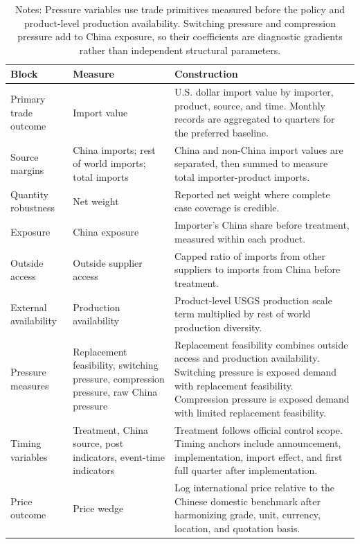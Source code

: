 \begin{table}[htbp]
\caption{Main Outcomes and Pressure Variables}
\label{tab:variables_outcomes}
\centering
\begingroup
\small
\setlength{\tabcolsep}{4pt}
\renewcommand{\arraystretch}{1.08}
\begin{tabularx}{\textwidth}{>{\raggedright\arraybackslash}p{}>{\raggedright\arraybackslash}p{}>{\raggedright\arraybackslash}X}
\toprule
Block & Measure & Construction \\
\midrule
Primary trade outcome & Import value & U.S. dollar import value by importer, product, source, and time. Monthly records are aggregated to quarters for the preferred baseline. \\
Source margins & China imports; rest of world imports; total imports & China and non-China import values are separated, then summed to measure total importer-product imports. \\
Quantity robustness & Net weight & Reported net weight where complete case coverage is credible. \\
Exposure & China exposure & Importer's China share before treatment, measured within each product. \\
Outside access & Outside supplier access & Capped ratio of imports from other suppliers to imports from China before treatment. \\
External availability & Production availability & Product-level USGS production scale term multiplied by rest of world production diversity. \\
Pressure measures & Replacement feasibility, switching pressure, compression pressure, raw China pressure & Replacement feasibility combines outside access and production availability. Switching pressure is exposed demand with replacement feasibility. Compression pressure is exposed demand with limited replacement feasibility. \\
Timing variables & Treatment, China source, post indicators, event-time indicators & Treatment follows official control scope. Timing anchors include announcement, implementation, import effect, and first full quarter after implementation. \\
Price outcome & Price wedge & Log international price relative to the Chinese domestic benchmark after harmonizing grade, unit, currency, location, and quotation basis. \\
\bottomrule
\end{tabularx}
\caption*{\footnotesize Notes: Pressure variables use trade primitives measured before the policy and product-level production availability. Switching pressure and compression pressure add to China exposure, so their coefficients are diagnostic gradients rather than independent structural parameters.}
\endgroup
\end{table}
